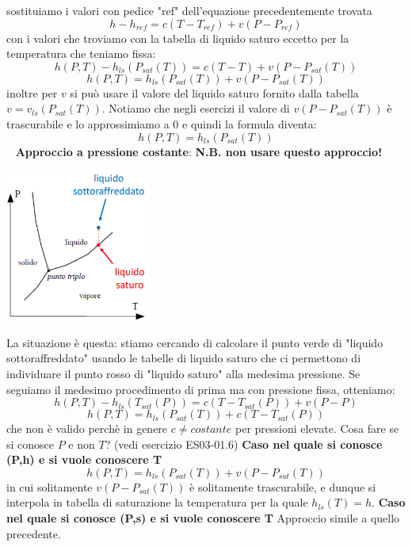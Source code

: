 \newline
sostituiamo i valori con pedice "ref" dell'equazione precedentemente trovata
\[
    h - h_{ref} = c(T-T_{ref}) + v (P-P_{ref})
\]
con i valori che troviamo con la tabella di liquido saturo eccetto per la temperatura che teniamo fissa:
\[
    h(P,T) - h_{ls}(P_{sat}(T)) = c(T - T) + v (P - P_{sat}(T))
\]
\[
    h(P,T) = h_{ls} (P_{sat}(T)) + v (P-P_{sat}(T))
\]
inoltre per $v$ si può usare il valore del liquido saturo fornito dalla tabella $v = v_{ls}(P_{sat}(T))$.\newline
Notiamo che negli esercizi il valore di $v(P-P_{sat}(T))$ è trascurabile e lo approssimiamo a $0$ e quindi la formula diventa:
\[
    h(P,T) = h_{ls} (P_{sat}(T))
\]
\ \newline
\textbf{Approccio a pressione costante}:\newline
\textbf{N.B. non usare questo approccio!}
\begin{center}
    \includegraphics[height=5cm]{../L04/img13.PNG}
\end{center}
La situazione è questa: stiamo cercando di calcolare il punto verde di "liquido sottoraffreddato" usando le tabelle di liquido saturo che ci permettono di individuare il punto rosso di "liquido saturo" alla medesima pressione.\newline
Se seguiamo il medesimo procedimento di prima ma con pressione fissa, otteniamo:
\[
    h(P,T) - h_{ls}(T_{sat}(P)) = c (T-T_{sat}(P)) + v(P-P)
\]
\[
    h(P,T) = h_{ls}(P_{sat} (T)) + c (T-T_{sat}(P))
\]
che non è valido perchè in genere $c \neq costante$ per pressioni elevate.\newline
Cosa fare se si conosce $P$ e non $T$? (vedi esercizio ES03-01.6)\newline
\newline
\textbf{Caso nel quale si conosce (P,h) e si vuole conoscere T}\newline
\[
    h(P,T) = h_{ls}(P_{sat}(T)) + v(P-P_{sat}(T))
\]
in cui solitamente $v (P-P_{sat}(T))$ è solitamente trascurabile, e dunque si interpola in tabella di saturazione la temperatura per la quale $h_{ls}(T) = h$.\newline
\newline
\textbf{Caso nel quale si conosce (P,s) e si vuole conoscere T}\newline
Approccio simile a quello precedente.
